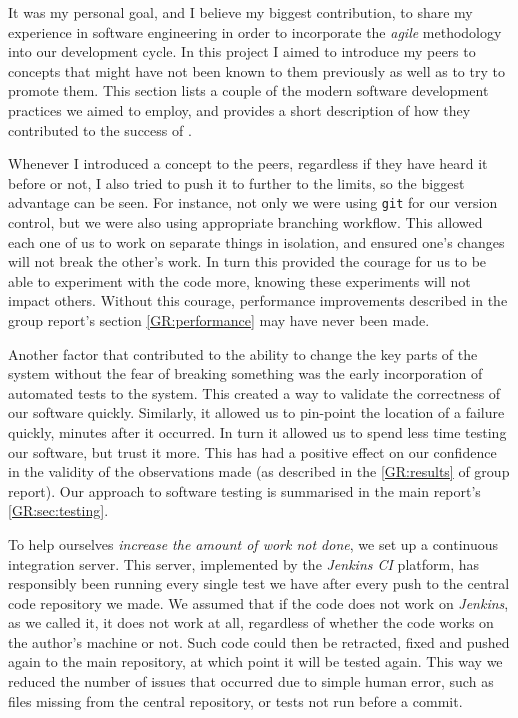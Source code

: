 It was my personal goal, and I believe my biggest contribution, to share my experience in software engineering in order to incorporate the \emph{agile} methodology into our development cycle. 
In this project I aimed to introduce my peers to concepts that might have not been known to them previously as well as to try to promote them. 
This section lists a couple of the modern software development practices we aimed to employ, and provides a short description of how they contributed to the success of \means{}.

Whenever I introduced a concept to the peers, regardless if they have heard it before or not, I also tried to push it to further to the limits, so the biggest advantage can be seen. 
For instance, not only we were using \verb"git"\cite{git} for our version control, but we were also using appropriate branching workflow. 
This allowed each one of us to work on separate things in isolation, and ensured one's changes will not break the other's work. 
In turn this provided the courage for us to be able to experiment with the code more, knowing these experiments will not impact others.
Without this courage, performance improvements described in the group report's section \autoref*{GR:performance} may have never been made.

Another factor that contributed to the ability to change the key parts of the system without the fear of breaking something was the early incorporation of automated tests to the system. 
This created a way to validate the correctness of our software quickly.
Similarly, it allowed us to pin-point the location of a failure quickly, minutes after it occurred.
In turn it allowed us to spend less time testing our software, but trust it more.
This has had a positive effect on our confidence in the validity of the observations made (as described in the \autoref*{GR:results} of group report). Our approach to software testing is summarised in the main report's \autoref*{GR:sec:testing}.

To help ourselves \emph{increase the amount of work not done}, we set up a continuous integration server.
This server, implemented by the \emph{Jenkins CI} platform\cite{_jenkins_????}, has responsibly been running every single test we have after every push to the central code repository we made. 
We assumed that if the code does not work on \emph{Jenkins}, as we called it, it does not work at all, regardless of whether the code works on the author's machine or not. 
Such code could then be retracted, fixed and pushed again to the main repository, at which point it will be tested again. 
This way we reduced the number of issues that occurred due to simple human error, such as files missing from the central repository, or tests not run before a commit.

